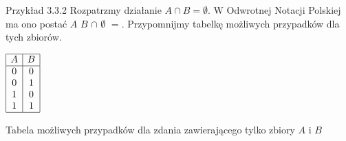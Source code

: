 \documentclass{SGGW-thesis}
\begin{document}
\begin{paragraph}{Przykład 3.3.2\label{ex:3.3.2}}
Rozpatrzmy działanie $A \cap B = \emptyset$. W Odwrotnej Notacji Polskiej ma ono postać $A$ $B$ $\cap$ $\emptyset$ $=$. Przypomnijmy tabelkę możliwych przypadków dla tych zbiorów.
    
    \begin{table}[h]
        \centering
        $\begin{array}{|c|c|}
            \hline
            A & B \\
            \hline
            0 & 0 \\
            0 & 1 \\
            1 & 0 \\
            1 & 1 \\
            \hline
        \end{array}$
        \caption{Tabela możliwych przypadków dla zdania zawierającego tylko zbiory $A$ i $B$}
    \end{table}  
    

\end{paragraph}
\end{document}
